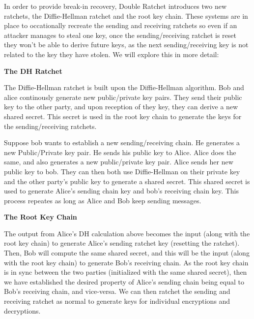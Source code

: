 In order to provide break-in recovery, Double Ratchet introduces two new ratchets, the Diffie-Hellman ratchet 
and the root key chain. These systems are in place to occationally recreate the sending and receiving ratchets 
so even if an attacker manages to steal one key, once the sending/receiving ratchet is reset they won't be able 
to derive future keys, as the next sending/receiving key is not related to the key they have stolen. We will explore this in more detail:

\textbf{The DH Ratchet}

The Diffie-Hellman ratchet is built upon the Diffie-Hellman algorithm. Bob and alice continously generate new 
public/private key pairs. They send their public key to the other party, and upon reception of they key, they can derive 
a new shared secret. This secret is used in the root key chain to generate the keys for the sending/receiving ratchets.

Suppose bob wants to establish a new sending/receiving chain. He generates 
a new Public/Private key pair. He sends his public key to Alice. Alice does the same, and also generates a new public/private 
key pair. Alice sends her new public key to bob. They can then both use Diffie-Hellman on their private key and the other party's public key 
to generate a shared secret. This shared secret is used to generate Alice's sending chain key and bob's receiving chain key. This process 
repeates as long as Alice and Bob keep sending messages.

\textbf{The Root Key Chain}

The output from Alice's DH calculation above becomes the input (along with the root key chain) to generate Alice's 
sending ratchet key (resetting the ratchet). Then, Bob will compute the same shared secret, and this will be the input (along with the root key chain)
to generate Bob's receiving chain. As the root key chain is in sync between the two parties (initialized with the same shared secret),
then we have established the desired property of Alice's sending chain being equal to Bob's receiving chain, and vice-versa.
We can then ratchet the sending and receiving ratchet as normal to generate keys for individual encryptions and decryptions.
